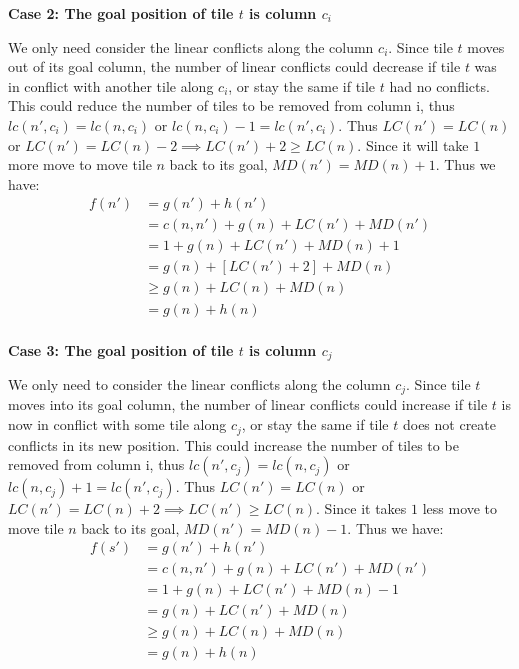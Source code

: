 \documentclass{llncs}
\begin{document}
\textbf{Case 2: The goal position of tile $t$ is column $c_i$}

We only need consider the linear conflicts along the column $c_i$. Since tile $t$ moves out of its goal column, the number of linear conflicts could decrease if tile $t$ was in conflict with another tile along $c_i$, or stay the same if tile $t$ had no conflicts. This could reduce the number of tiles to be removed from column i, thus $lc(n',c_i) =lc(n,c_i)$ or $lc(n,c_i)-1 = lc(n',c_i)$. Thus $LC(n') = LC(n)$ or $LC(n') = LC(n) - 2 \implies LC(n') + 2 \geq LC(n)$. Since it will take $1$ more move to move tile $n$ back to its goal, $MD(n') = MD(n) + 1$. Thus we have:
\begin{align}
    f(n') \nonumber
    	&= g(n') + h(n') \\\nonumber
        &= c(n,n') + g(n) + LC(n') + MD(n') \\\nonumber
        &= 1 + g(n) + LC(n') + MD(n) + 1 \\\nonumber
        &= g(n) + [LC(n') + 2] + MD(n) \\\nonumber
        &\geq g(n) + LC(n) + MD(n) \\\nonumber
        &= g(n) + h(n) \\\nonumber
\end{align}

\textbf{Case 3: The goal position of tile $t$ is column $c_j$}

We only need to consider the linear conflicts along the column $c_j$. Since tile $t$ moves into its goal column, the number of linear conflicts could increase if tile $t$ is now in conflict with some tile along $c_j$, or stay the same if tile $t$ does not create conflicts in its new position. This could increase the number of tiles to be removed from column i, thus $lc(n',c_j) =lc(n,c_j)$ or $lc(n,c_j)+1 = lc(n',c_j)$. Thus $LC(n') = LC(n)$ or $LC(n') = LC(n) + 2 \implies LC(n') \geq LC(n)$. Since it takes $1$ less move to move tile $n$ back to its goal, $MD(n') = MD(n) - 1$. Thus we have:
\begin{align}
    f(s') \nonumber &= g(n') + h(n') \\\nonumber
        &= c(n,n') + g(n) + LC(n') + MD(n') \\\nonumber
        &= 1 + g(n) + LC(n') + MD(n) - 1 \\\nonumber
        &= g(n) + LC(n') + MD(n) \\\nonumber
        &\geq g(n) + LC(n) + MD(n) \\\nonumber
        &= g(n) + h(n) \\\nonumber
\end{align}
\end{document}
